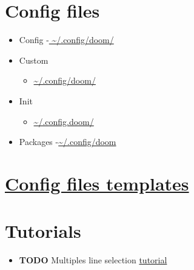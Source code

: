 \documentclass{article}
\begin{document}
\section*{Config files}
\label{sec:orgb180341}
\begin{itemize}
\item Config
\label{sec:org7e028be}
-\href{file:///Users/hadrienklotz/.config/doom/config.el}{ \textasciitilde{}/.config/doom/}
\item Custom
\label{sec:org1dfacf5}
\begin{itemize}
\item \href{file:///Users/hadrienklotz/.config/doom/custom.el}{\textasciitilde{}/.config/doom/}
\end{itemize}
\item Init
\label{sec:orgc55580c}
\begin{itemize}
\item \href{file:///Users/hadrienklotz/.config/doom/init.el}{\textasciitilde{}/.config.doom/}
\end{itemize}
\item Packages
\label{sec:orgc284a85}
-\href{file:///Users/hadrienklotz/.config/doom/packages.el}{\textasciitilde{}/.config/doom}
\end{itemize}
\section*{\href{https://github.com/doomemacs/doomemacs/blob/5ad99220b86ae1bf421861dfad24492d768ac4d9/templates/config.example.el}{Config files templates}}
\label{sec:org378c098}
\section*{Tutorials}
\label{sec:orgcb9f303}
\begin{itemize}
\item {\bfseries\sffamily TODO} Multiples line selection \href{https://emacsrocks.com/e13.html}{tutorial}
\label{sec:org2e26453}
\end{itemize}
\end{document}
